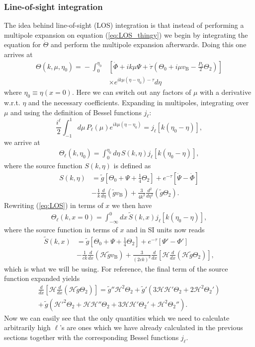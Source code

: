 \documentclass[%
reprint,
 amsmath,amssymb,
 aps,
]{revtex4-2}
\newcommand{\Hp}{\mathcal{H}}
\begin{document}
\subsubsection{Line-of-sight integration}
The idea behind line-of-sight (LOS) integration is that instead of performing a multipole expansion on equation (\ref{eq:LOS_thingy}) we begin by integrating the equation for $\dot\Theta$ and perform the multipole expansion afterwards. Doing this one arrives at
\begin{align*}
	\Theta(k,\mu,\eta_0)=\!-\!\int_0^{\eta_0}&\left[\dot\Phi\!+\!ik\mu\Psi\!+\!\dot\tau\left(\Theta_0\!+\!i\mu v_{\text{B}}\!-\!\frac{P_2}{2}\Theta_2\right)\right]\\
	&\times e^{ik\mu(\eta-\eta_0)-\tau}d\eta
\end{align*}
where $\eta_0\equiv\eta(x=0)$. Here we can switch out any factors of $\mu$ with a derivative w.r.t. $\eta$ and the necessary coefficients. Expanding in multipoles, integrating over $\mu$ and using the definition of Bessel functions $j_\ell$:
\[\frac{i^\ell}{2}\int_{-1}^1d\mu\,P_\ell(\mu)e^{ik\mu(\eta-\eta_0)}=j_\ell[k(\eta_0-\eta)], \]
we arrive at
\begin{align}
	\Theta_\ell(k,\eta_0)=\int_0^{\eta_0}d\eta\,S(k,\eta)j_\ell[k(\eta_0-\eta)],
	\label{eq:LOS}
\end{align}
where the source function $S(k,\eta)$ is defined as
\begin{align*}
	S(k,\eta)&=\tilde{g}\left[\Theta_0+\Psi+\frac{1}{4}\Theta_2\right]+e^{-\tau}\left[\dot\Psi-\dot\Phi\right]\\
	&-\frac{1}{k}\frac{d}{d\eta}(\tilde{g}v_\text{B})+\frac{3}{4k^2}\frac{d^2}{d\eta^2}(\tilde{g}\Theta_2).
\end{align*}
Rewriting (\ref{eq:LOS}) in terms of $x$ we then have
\begin{align}
	\Theta_\ell(k,x=0)=\int_{-\infty}^0dx\,\tilde{S}(k,x)j_\ell[k(\eta_0-\eta)],
	\label{eq:LOSx}
\end{align}
where the source function in terms of $x$ and in SI units now reads
\begin{align}
	\tilde{S}(k,x)&=\tilde{g}\left[\Theta_0+\Psi+\frac{1}{4}\Theta_2\right]+e^{-\tau}[\Psi'-\Phi']\nonumber\\
	&-\frac{1}{ck}\frac{d}{dx}(\Hp\tilde{g}v_\text{B})+\frac{3}{(2ck)^2}\frac{d}{dx}\left[\Hp\frac{d}{dx}(\Hp\tilde{g}\Theta_2)\right],\label{eq:source_function}
\end{align}
which is what we will be using. For reference, the final term of the source function expanded yields
\begin{align*}
	\frac{d}{dx}\left[\Hp\frac{d}{dx}(\Hp\tilde{g}\Theta_2)\right]=\tilde{g}''\Hp^2\Theta_2+\tilde{g}'(3\Hp\Hp'\Theta_2+2\Hp^2\Theta_2')\\
	+\,\tilde{g}(\Hp'^2\Theta_2+\Hp\Hp''\Theta_2+3\Hp\Hp'\Theta_2'+\Hp^2\Theta_2'').
\end{align*}
Now we can easily see that the only quantities which we need to calculate arbitrarily high $\ell$'s are ones which we have already calculated in the previous sections together with the corresponding Bessel functions $j_\ell$. 
\end{document}
